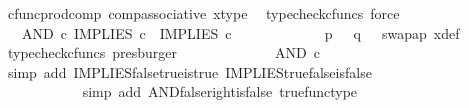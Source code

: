 \begin{isabellebody}
\ cfunc{\isacharunderscore}{\kern0pt}prod{\isacharunderscore}{\kern0pt}comp\ comp{\isacharunderscore}{\kern0pt}associative{}\ x{\isacharunderscore}{\kern0pt}type\ \isamarkupfalse%
\ {\isacharparenleft}{\kern0pt}typecheck{\isacharunderscore}{\kern0pt}cfuncs{\isacharcomma}{\kern0pt}\ force{\isacharparenright}{\kern0pt}\isanewline
\ \ \ \ \ \ \ \ \isamarkupfalse%
\ \isamarkupfalse%
\ {\isachardoublequoteopen}{\isachardot}{\kern0pt}{\isachardot}{\kern0pt}{\isachardot}{\kern0pt}\ {\isacharequal}{\kern0pt}\ AND\ {\isasymcirc}\isactrlsub c\ {\isasymlangle}IMPLIES\ {\isasymcirc}\isactrlsub c\ {\isasymlangle}{\isasymf}{\isacharcomma}{\kern0pt}{\isasymt}{\isasymrangle}{\isacharcomma}{\kern0pt}\ IMPLIES\ {\isasymcirc}\isactrlsub c\ {\isasymlangle}{\isasymt}{\isacharcomma}{\kern0pt}{\isasymf}{\isasymrangle}{\isasymrangle}{\isachardoublequoteclose}\isanewline
\ \ \ \ \ \ \ \ \ \ \isamarkupfalse%
\ {\isacartoucheopen}p\ {\isacharequal}{\kern0pt}\ {\isasymf}{\isacartoucheclose}\ {\isacartoucheopen}q\ {\isacharequal}{\kern0pt}\ {\isasymt}{\isacartoucheclose}\ swap{\isacharunderscore}{\kern0pt}ap\ x{\isacharunderscore}{\kern0pt}def\ \isamarkupfalse%
\ {\isacharparenleft}{\kern0pt}typecheck{\isacharunderscore}{\kern0pt}cfuncs{\isacharcomma}{\kern0pt}\ presburger{\isacharparenright}{\kern0pt}\isanewline
\ \ \ \ \ \ \ \ \isamarkupfalse%
\ \isamarkupfalse%
\ {\isachardoublequoteopen}{\isachardot}{\kern0pt}{\isachardot}{\kern0pt}{\isachardot}{\kern0pt}\ {\isacharequal}{\kern0pt}\ AND\ {\isasymcirc}\isactrlsub c\ {\isasymlangle}{\isasymt}{\isacharcomma}{\kern0pt}\ {\isasymf}{\isasymrangle}{\isachardoublequoteclose}\isanewline
\ \ \ \ \ \ \ \ \ \ \isamarkupfalse%
\ {\isacharparenleft}{\kern0pt}simp\ add{\isacharcolon}{\kern0pt}\ IMPLIES{\isacharunderscore}{\kern0pt}false{\isacharunderscore}{\kern0pt}true{\isacharunderscore}{\kern0pt}is{\isacharunderscore}{\kern0pt}true\ IMPLIES{\isacharunderscore}{\kern0pt}true{\isacharunderscore}{\kern0pt}false{\isacharunderscore}{\kern0pt}is{\isacharunderscore}{\kern0pt}false{\isacharparenright}{\kern0pt}\isanewline
\ \ \ \ \ \ \ \ \isamarkupfalse%
\ \isamarkupfalse%
\ {\isachardoublequoteopen}{\isachardot}{\kern0pt}{\isachardot}{\kern0pt}{\isachardot}{\kern0pt}\ {\isacharequal}{\kern0pt}\ {\isasymf}{\isachardoublequoteclose}\isanewline
\ \ \ \ \ \ \ \ \ \ \isamarkupfalse%
\ {\isacharparenleft}{\kern0pt}simp\ add{\isacharcolon}{\kern0pt}\ AND{\isacharunderscore}{\kern0pt}false{\isacharunderscore}{\kern0pt}right{\isacharunderscore}{\kern0pt}is{\isacharunderscore}{\kern0pt}false\ true{\isacharunderscore}{\kern0pt}func{\isacharunderscore}{\kern0pt}type{\isacharparenright}{\kern0pt}\isanewline

\end{isabellebody}
